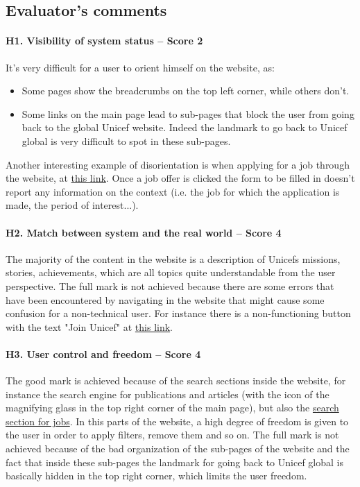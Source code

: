\clearpage

\subsection*{Evaluator's comments}
\paragraph*{H1. Visibility of system status – Score 2}
It's very difficult for a user to orient himself on the website, as:
\begin{itemize}
	\item Some pages show the breadcrumbs on the top left corner, while others don't.
	\item Some links on the main page lead to sub-pages that block the user from going back to the global Unicef website. Indeed the landmark to go back to Unicef global is very difficult to spot in these sub-pages.
\end{itemize}
Another interesting example of disorientation is when applying for a job through the website, at \href{https://jobs.unicef.org/en-us/listing/}{this link}. Once a job offer is clicked the form to be filled in doesn't report any information on the context (i.e. the job for which the application is made, the period of interest...).

\paragraph*{H2. Match between system and the real world – Score 4}
The majority of the content in the website is a description of Unicefs missions, stories, achievements, which are all topics quite understandable from the user perspective. 
The full mark is not achieved because there are some errors that have been encountered by navigating in the website that might cause some confusion for a non-technical user. For instance there is a non-functioning button with the text "Join Unicef" at \href{https://www.unicef.org/partnerships}{this link}.


\paragraph*{H3. User control and freedom – Score 4}
The good mark is achieved because of the search sections inside the website, for instance the search engine for publications and articles (with the icon of the magnifying glass in the top right corner of the main page), but also the \href{https://jobs.unicef.org/en-us/listing/}{search section for jobs}. In this parts of the website, a high degree of freedom is given to the user in order to apply filters, remove them and so on.
The full mark is not achieved because of the bad organization of the sub-pages of the website and the fact that inside these sub-pages the landmark for going back to Unicef global is basically hidden in the top right corner, which limits the user freedom.



